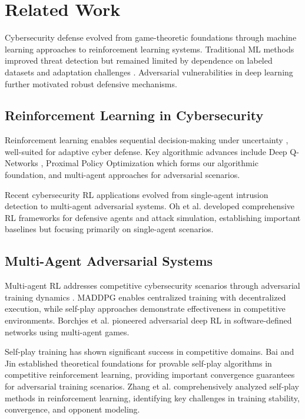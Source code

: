 \documentclass[12pt,oneside]{article}
\begin{document}
\section{Related Work}

Cybersecurity defense evolved from game-theoretic foundations \cite{alpcan2010network} through machine learning approaches to reinforcement learning systems. Traditional ML methods improved threat detection but remained limited by dependence on labeled datasets and adaptation challenges \cite{sommer2010outside}. Adversarial vulnerabilities in deep learning \cite{goodfellow2014explaining} further motivated robust defensive mechanisms.

\subsection{Reinforcement Learning in Cybersecurity}

Reinforcement learning enables sequential decision-making under uncertainty \cite{sutton2018reinforcement}, well-suited for adaptive cyber defense. Key algorithmic advances include Deep Q-Networks \cite{mnih2015human}, Proximal Policy Optimization \cite{schulman2017proximal} which forms our algorithmic foundation, and multi-agent approaches \cite{lowe2017multi} for adversarial scenarios.

Recent cybersecurity RL applications evolved from single-agent intrusion detection \cite{zhu2021survey} to multi-agent adversarial systems. Oh et al. \cite{oh2023applying,oh2024employing} developed comprehensive RL frameworks for defensive agents and attack simulation, establishing important baselines but focusing primarily on single-agent scenarios.

\subsection{Multi-Agent Adversarial Systems}

Multi-agent RL addresses competitive cybersecurity scenarios through adversarial training dynamics \cite{tampuu2017multiagent}. MADDPG \cite{lowe2017multi} enables centralized training with decentralized execution, while self-play approaches \cite{openai2019dota} demonstrate effectiveness in competitive environments. Borchjes et al. \cite{borchjes2023adversarial} pioneered adversarial deep RL in software-defined networks using multi-agent games.

Self-play training has shown significant success in competitive domains. Bai and Jin \cite{bai2020provable} established theoretical foundations for provable self-play algorithms in competitive reinforcement learning, providing important convergence guarantees for adversarial training scenarios. Zhang et al. \cite{zhang2024survey} comprehensively analyzed self-play methods in reinforcement learning, identifying key challenges in training stability, convergence, and opponent modeling.
\end{document}

